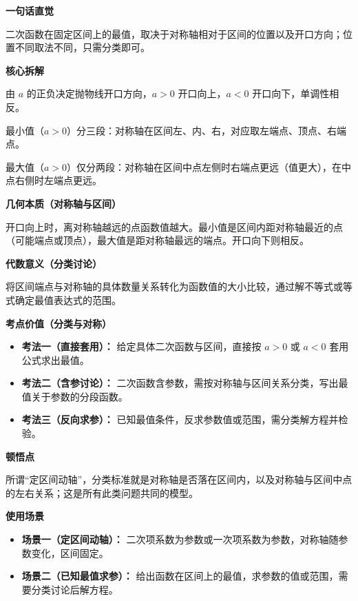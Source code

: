 \begin{explanationbox}
	\textbf{\textcolor{CExplanation}{一句话直觉}}

	二次函数在固定区间上的最值，取决于对称轴相对于区间的位置以及开口方向；位置不同取法不同，只需分类即可。

	\medskip
	\textbf{\textcolor{CExplanation}{核心拆解}}
	\begin{description}[style=nextline, leftmargin=2.8em, labelsep=0.5em, itemsep=0.45em]
		\item[\textbf{要点一（开口定向）：}] 由 $a$ 的正负决定抛物线开口方向，$a>0$ 开口向上，$a<0$ 开口向下，单调性相反。
		\item[\textbf{要点二（对称轴分段）：}] 最小值（$a>0$）分三段：对称轴在区间左、内、右，对应取左端点、顶点、右端点。
		\item[\textbf{要点三（中点判远）：}] 最大值（$a>0$）仅分两段：对称轴在区间中点左侧时右端点更远（值更大），在中点右侧时左端点更远。
	\end{description}

	\medskip
	\textbf{\textcolor{CExplanation}{几何本质（对称轴与区间）}}

	开口向上时，离对称轴越远的点函数值越大。最小值是区间内距对称轴最近的点（可能端点或顶点），最大值是距对称轴最远的端点。开口向下则相反。

	\medskip
	\textbf{\textcolor{CExplanation}{代数意义（分类讨论）}}

	将区间端点与对称轴的具体数量关系转化为函数值的大小比较，通过解不等式或等式确定最值表达式的范围。

	\medskip
	\textbf{\textcolor{CExplanation}{考点价值（分类与对称）}}
	\begin{itemize}[leftmargin=*, itemsep=0.5em, topsep=0.4em]
		\item \textbf{考法一（直接套用）：} 给定具体二次函数与区间，直接按 $a>0$ 或 $a<0$ 套用公式求出最值。
		\item \textbf{考法二（含参讨论）：} 二次函数含参数，需按对称轴与区间关系分类，写出最值关于参数的分段函数。
		\item \textbf{考法三（反向求参）：} 已知最值条件，反求参数值或范围，需分类解方程并检验。
	\end{itemize}

	\medskip
	\textbf{\textcolor{CExplanation}{顿悟点}}

	所谓“定区间动轴”，分类标准就是对称轴是否落在区间内，以及对称轴与区间中点的左右关系；这是所有此类问题共同的模型。

	\medskip
	\textbf{\textcolor{CExplanation}{使用场景}}
	\begin{itemize}[leftmargin=*, itemsep=0.5em, topsep=0.4em]
		\item \textbf{场景一（定区间动轴）：} 二次项系数为参数或一次项系数为参数，对称轴随参数变化，区间固定。
		\item \textbf{场景二（已知最值求参）：} 给出函数在区间上的最值，求参数的值或范围，需要分类讨论后解方程。
	\end{itemize}
\end{explanationbox}
